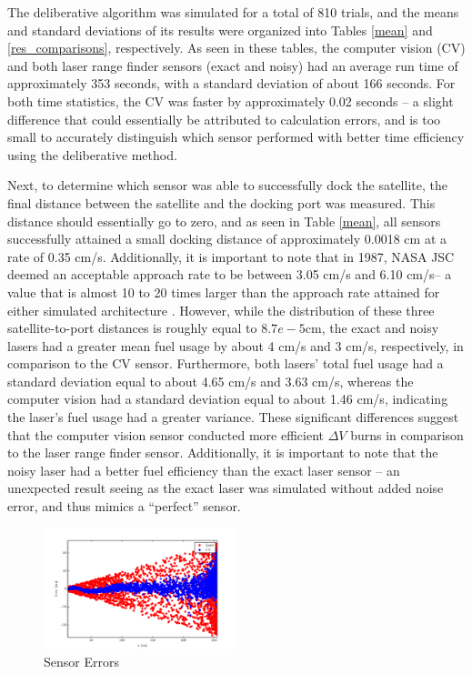\documentclass[journal, 10pt]{IEEEtran}
\begin{document}
The deliberative algorithm was simulated for a total of 810 trials, and the means and standard deviations of its results were organized into Tables \ref{mean} and \ref{res_comparisons}, respectively. As seen in these tables, the computer vision (CV) and both laser range finder sensors (exact and noisy) had an average run time of approximately 353 seconds, with a standard deviation of about 166 seconds. For both time statistics, the CV was faster by approximately 0.02 seconds -- a slight difference that could essentially be attributed to calculation errors, and is too small to accurately distinguish which sensor performed with better time efficiency using the deliberative method.

Next, to determine which sensor was able to successfully dock the satellite, the final distance between the satellite and the docking port was measured. This distance should essentially go to zero, and as seen in Table \ref{mean}, all sensors successfully attained a small docking distance of approximately 0.0018 cm at a rate of 0.35 cm/s. Additionally, it is important to note that in 1987, NASA JSC deemed an acceptable approach rate to be between 3.05 cm/s and 6.10 cm/s-- a value that is almost 10 to 20 times larger than the approach rate attained for either simulated architecture \cite{approachRate}. However, while the distribution of these three satellite-to-port distances is roughly equal to $8.7e-5$cm, the exact and noisy lasers had a greater mean fuel usage by about 4 cm/s and 3 cm/s, respectively, in comparison to the CV sensor. Furthermore, both lasers' total fuel usage had a standard deviation equal to about 4.65 cm/s and 3.63 cm/s, whereas the computer vision had a standard deviation equal to about 1.46 cm/s, indicating the laser's fuel usage had a greater variance. These significant differences suggest that the computer vision sensor conducted more efficient $\Delta V$ burns in comparison to the laser range finder sensor. Additionally, it is important to note that the noisy laser had a better fuel efficiency than the exact laser sensor -- an unexpected result seeing as the exact laser was simulated without added noise error, and thus mimics a ``perfect'' sensor.

\begin{figure}
\begin{center}
\includegraphics[width=0.5\textwidth]{figures/SensorErrors.pdf}
\caption{Sensor Errors}
\label{error}
\end{center}
\end{figure}
\end{document}
